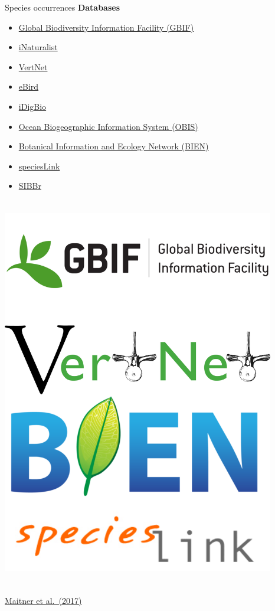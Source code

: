 \documentclass[
  ignorenonframetext,
]{beamer}
\providecommand{\tightlist}{%
  \setlength{\itemsep}{0pt}\setlength{\parskip}{0pt}}\usepackage{longtable,booktabs,array}
\begin{document}
\begin{frame}{Species occurrences}
\label{species-occurrences-2}
\textbf{Databases}

\begin{itemize}
\tightlist
\item
  \href{https://www.gbif.org/}{Global Biodiversity Information Facility
  (GBIF)}
\item
  \href{https://www.inaturalist.org/}{iNaturalist}
\item
  \href{http://vertnet.org/}{VertNet}
\item
  \href{https://ebird.org/home}{eBird}
\item
  \href{https://www.idigbio.org/}{iDigBio}
\item
  \href{https://obis.org/}{Ocean Biogeographic Information System
  (OBIS)}
\item
  \href{https://bien.nceas.ucsb.edu/bien/}{Botanical Information and
  Ecology Network (BIEN)}
\item
  \href{https://specieslink.net/}{speciesLink}
\item
  \href{https://www.sibbr.gov.br/?lang=pt_BR}{SIBBr}
\end{itemize}

\includegraphics[width=4.6875in,height=6.77083in]{img/sdm_occ_fontes.png}

\href{https://doi.org/10.1111/2041-210X.12861}{Maitner et al.~(2017)}
\end{frame}
\end{document}
